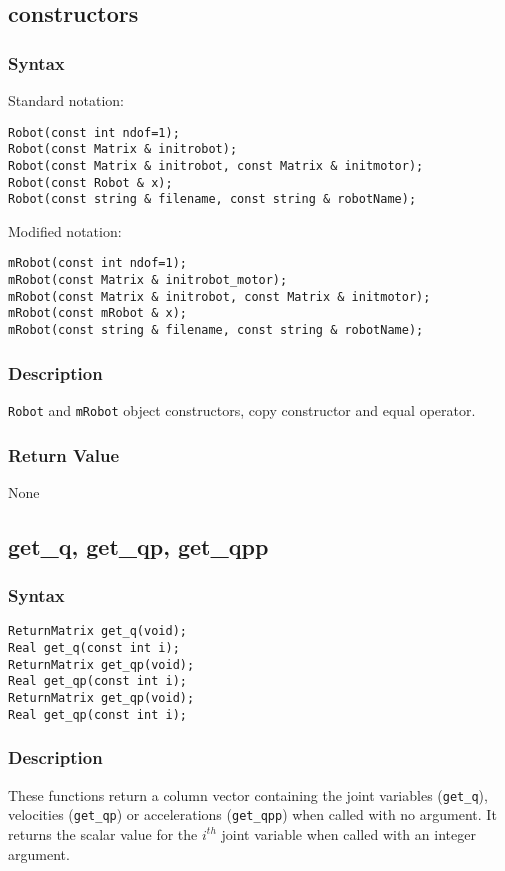 \documentclass[11pt,fleqn,letterpaper]{report}
\begin{document}
\newpage

\subsection*{constructors}
\subsubsection*{Syntax}

Standard notation:
\begin{verbatim}
Robot(const int ndof=1);
Robot(const Matrix & initrobot);
Robot(const Matrix & initrobot, const Matrix & initmotor);
Robot(const Robot & x);
Robot(const string & filename, const string & robotName);
\end{verbatim}
Modified notation:
\begin{verbatim}
mRobot(const int ndof=1);
mRobot(const Matrix & initrobot_motor);
mRobot(const Matrix & initrobot, const Matrix & initmotor);
mRobot(const mRobot & x);
mRobot(const string & filename, const string & robotName);
\end{verbatim}
\subsubsection*{Description}

\texttt{Robot} and \texttt{mRobot} object constructors, copy
constructor and equal operator.


\subsubsection*{Return Value}

None

\newpage

\subsection*{get\_q, get\_qp, get\_qpp}
\subsubsection*{Syntax}
\begin{verbatim}
ReturnMatrix get_q(void);
Real get_q(const int i);
ReturnMatrix get_qp(void);
Real get_qp(const int i);
ReturnMatrix get_qp(void);
Real get_qp(const int i);
\end{verbatim}
\subsubsection*{Description}
These functions return a column vector containing the joint variables
(\texttt{get\_q}), velocities (\texttt{get\_qp}) or accelerations
(\texttt{get\_qpp}) when called with no argument. It returns the
scalar value for the $i^{th}$ joint variable when called with an
integer argument.
\end{document}
